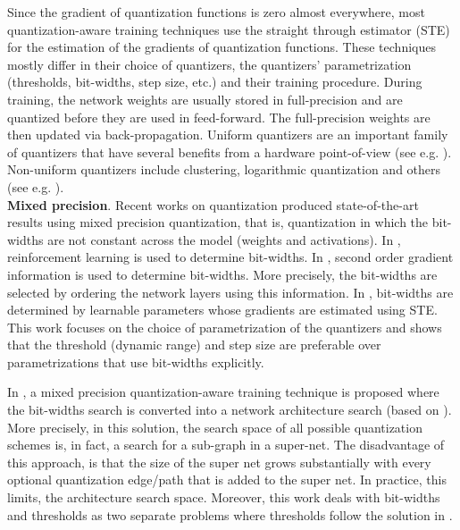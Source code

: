 \documentclass{article}
\begin{document}
Since the gradient of quantization functions is zero almost everywhere, most quantization-aware training techniques use the straight through estimator (STE) \cite{bengio2013estimating} for the estimation of the gradients of quantization functions.
These techniques mostly differ in their choice of quantizers, the quantizers' parametrization (thresholds, bit-widths, step size, etc.) and their training procedure. 
During training, the network weights are usually stored in full-precision and are quantized before they are used in feed-forward. 
The full-precision weights are then updated via back-propagation. 
Uniform quantizers are an important family of quantizers that have several benefits from a hardware point-of-view (see e.g. \cite{esser2019learned,jain2019trained,Uhlich2020Mixed}).
Non-uniform quantizers include clustering, logarithmic quantization and others (see e.g. \cite{baskin2018uniq,miyashita2016convolutional,zhang2018lq,zhou2017incremental}).\\

\textbf{Mixed precision}. Recent works on quantization produced state-of-the-art results using mixed precision quantization, that is, quantization in which the bit-widths are not constant across the model (weights and activations).
In \cite{wang2019haq}, reinforcement learning is used to determine bit-widths.
In \cite{dong2019hawq}, second order gradient information is used to determine bit-widths. 
More precisely, the bit-widths are selected by ordering the network layers using this information.
In \cite{Uhlich2020Mixed}, bit-widths are determined by learnable parameters whose gradients are estimated using STE. This work focuses on the choice of parametrization of the quantizers and shows that the threshold (dynamic range) and step size are preferable over parametrizations that use bit-widths explicitly.

In \cite{wu2018mixed}, a mixed precision quantization-aware training technique is proposed where the bit-widths search is converted into a network architecture search (based on \cite{liu2018darts}).
More precisely, in this solution, the search space of all possible quantization schemes is, in fact, a search for a sub-graph in a super-net.
The disadvantage of this approach, is that the size of the super net grows substantially with every optional quantization edge/path that is added to the super net.
In practice, this limits, the architecture search space.
Moreover, this work deals with bit-widths and thresholds as two separate problems where thresholds follow the solution in \cite{choi2018pact}.
\end{document}
